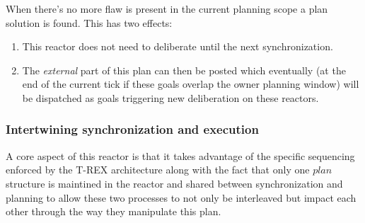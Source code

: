 When there's no more flaw is present in the current planning scope a
plan  solution is found. This has two effects:
\begin{enumerate}
\item This reactor does not need to deliberate until the next synchronization.
\item The {\em external} part of this plan can then be posted which
  eventually (at the end of the current tick if these goals overlap
  the owner planning window) will be dispatched as goals triggering
  new deliberation on these reactors.
\end{enumerate}

\subsubsection{Intertwining synchronization and execution}
\label{sec:arch:intertwine}

A core aspect of this reactor is that it takes advantage of the
specific sequencing enforced by the T-REX architecture along with the
fact that only one $plan$ structure is maintined in the reactor and
shared between synchronization and planning to allow these two processes
to not only be interleaved but impact each other through the way they
manipulate this plan. 






